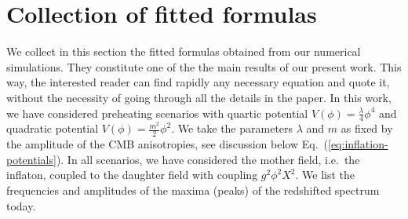 \documentclass[a4paper,11pt]{article}
\begin{document}
 
\section{Collection of fitted formulas} \label{sec:Summary}

We collect in this section the fitted formulas obtained from our numerical simulations. They constitute one of the the main results of our present work. This way, the interested reader can find rapidly any necessary equation and quote it, without the necessity of going through all the details in the paper. In this work, we have considered preheating scenarios with quartic potential $V (\phi) = \frac{\lambda}{4} \phi^4$ and quadratic potential $V (\phi) = \frac{m^2}{2} \phi^2$. We take the parameters $\lambda$ and $m$ as fixed by the amplitude of the CMB anisotropies, see discussion below Eq.~(\ref{eq:inflation-potentials}). In all scenarios, we have considered the mother field, i.e.~the inflaton, coupled to the daughter field with coupling $g^2\phi^2X^2$. We list the frequencies and amplitudes of the maxima (peaks) of the redshifted spectrum today.
 
\end{document}
